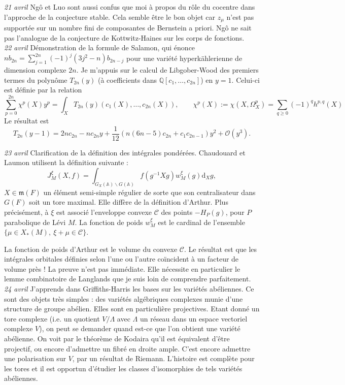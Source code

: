 \documentclass[11.8pt]{amsart}
\newcommand\Q{\mathbb Q}
\theoremstyle{plain}
\theoremstyle{definition}
\theoremstyle{remark}
\begin{document}
\textsl{21 avril} \quad Ngô et Luo sont aussi confus que moi à propos du rôle du cocentre dans l'approche de la conjecture stable. Cela semble être le bon objet car $z_\mu$ n'est pas supportée sur un nombre fini de composantes de Bernstein a priori. Ngô ne sait pas l'analogue de la conjecture de Kottwitz-Haines sur les corps de fonctions.\\

\textsl{22 avril} \quad Démonstration de la formule de Salamon, qui énonce $nb_{2n} =  \sum_{j=1}^{2n} (-1)^j(3j^2-n)b_{2n-j}$ pour une variété hyperkählerienne de dimension complexe $2n$. Je m'appuis sur le calcul de Libgober-Wood des premiers termes du polynôme $T_{2n}(y)$ (à coefficients dans $\Q[c_1,\ldots, c_{2n}]$) en $y=1$. Celui-ci est définie par la relation 
$$\sum_{p=0}^{2n} \chi^p(X)y^p = \int_XT_{2n}(y)(c_1(X), \ldots, c_{2n}(X)), \qquad \chi^p(X) := \chi(X,\Omega_X^p) = \sum_{q\ge 0}(-1)^qh^{p,q}(X)$$
Le résultat est $$T_{2n}(y-1) = 2nc_{2n} - nc_{2n}y +\frac1{12}(n(6n-5)c_{2n}+c_1c_{2n-1})y^2 + \mathcal O(y^3).$$

\textsl{23 avril} \quad Clarification de la définition des intégrales pondérées. Chaudouard et Laumon utilisent la définition suivante : $$J^\xi_M(X, f) = \int_{G_X(\mathbb A)\backslash G(\mathbb A)} f(g^{-1}Xg)w^\xi_M(g) \mathrm d_Xg,$$ $X\in \mathfrak m(F)$ un élément semi-simple régulier de sorte que son centralisateur dans $G(F)$ soit un tore maximal. Elle diffère de la définition d'Arthur. Plus précisément, à $\xi$ est associé l'enveloppe convexe $\mathcal C$ des points $-H_P(g)$, pour $P$ parabolique de Lévi $M$. La fonction de poids $w^\xi_M$ est le cardinal de l'ensemble $\{\mu \in X_*(M), \ \xi+\mu \in \mathcal C \}$. 

La fonction de poids d'Arthur est le volume du convexe $\mathcal C$. Le résultat est que les intégrales orbitales définies selon l'une ou l'autre coïncident à un facteur de volume près ! La preuve n'est pas immédiate. Elle nécessite en particulier le lemme combinatoire de Langlands que je suis loin de comprendre parfaitement.\\ 

\textsl{24 avril} \quad J'apprends dans Griffiths-Harris les bases sur les variétés abéliennes. Ce sont des objets très simples : des variétés algébriques complexes munie d'une structure de groupe abélien. Elles sont en particulière projectives. Etant donné un tore complexe (i.e. un quotient $V/\Lambda$ avec $\Lambda$ un réseau dans un espace vectoriel complexe $V$), on peut se demander quand est-ce que l'on obtient une variété abélienne. On voit par le théorème de Kodaira qu'il est équivalent d'être projectif, ou encore d'admettre un fibré en droite ample. C'est encore admettre une polarisation sur $V$, par un résultat de Riemann. L'histoire est complète pour les tores et il est opportun d'étudier les classes d'isomorphies de tels variétés abéliennes. 
\end{document}
